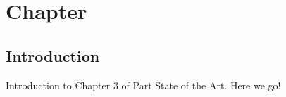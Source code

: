 \chapter{Chapter}
\label{sect::sota_chapter3}

\section{Introduction}

Introduction to Chapter 3 of Part State of the Art. Here we go!